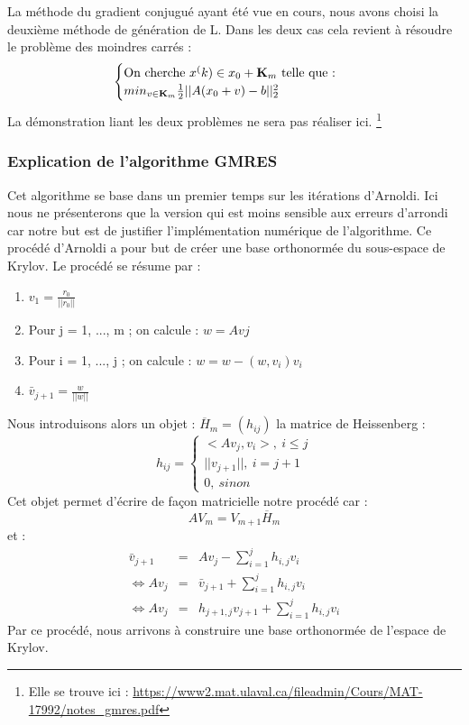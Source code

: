 La méthode du gradient conjugué ayant été vue en cours, nous avons choisi la deuxième méthode de génération de L. Dans les deux cas cela revient à résoudre le problème des moindres carrés : 
\begin{equation}
\begin{cases}
\text{On cherche $x^(k) \in x_0 + \mathbf{K}_m$ telle que : }\\
min_{v \in \mathbf{K}_m} \frac{1}{2}||A (x_0 + v) - b||^2_2
\end{cases}
 \label{moindrecarre}
\end{equation}
La démonstration liant les deux problèmes ne sera pas réaliser ici. \footnote{Elle se trouve ici : \url{https://www2.mat.ulaval.ca/fileadmin/Cours/MAT-17992/notes_gmres.pdf}}
\subsubsection{Explication de l'algorithme GMRES}
Cet algorithme se base dans un premier temps sur les itérations d'Arnoldi. Ici nous ne présenterons que la version qui est moins sensible aux erreurs d'arrondi car notre but est de justifier l'implémentation numérique de l'algorithme. Ce procédé d'Arnoldi a pour but de créer une base orthonormée du sous-espace de Krylov. Le procédé se résume par : 
\begin{enumerate}
	\item $v_1 = \frac{r_0}{||r_0||}$
	\item Pour j = 1, ..., m ; on calcule : $w = Avj$
	\item Pour i = 1, ..., j ; on calcule : $w = w - (w, v_i) v_i$
	\item $\bar{v}_{j+1} = \frac{w}{||w||}$
\end{enumerate}

Nous introduisons alors un objet : $\overline{H}_m = (h_{ij})$ la matrice de Heissenberg : 
\begin{equation}
h_{ij} = \begin{cases}
<Av_j, v_i>, \ i\leq j \\
||v_{j+1}||, \ i = j + 1 \\
0, \ sinon
\end{cases}
\end{equation}
Cet objet permet d'écrire de façon matricielle notre procédé car  : 
\begin{equation}
AV_m = V_{m+1}\overline{H}_m
\end{equation}
et : 
\begin{eqnarray}
\bar{v}_{j+1} &=& Av_j - \sum_{i=1}^{j} h_{i,j} v_i\\
\Leftrightarrow Av_j &=& \bar{v}_{j+1} + \sum_{i=1}^{j} h_{i,j} v_i \\
\Leftrightarrow Av_j &=& h_{j+1, j}v_{j+1} + \sum_{i=1}^{j} h_{i,j} v_i
\end{eqnarray}
Par ce  procédé, nous arrivons à construire une base orthonormée de l'espace de Krylov.\\

